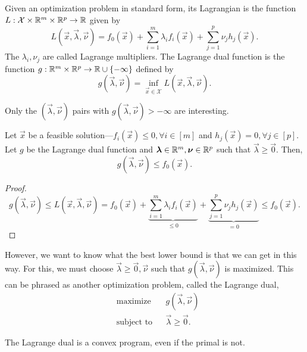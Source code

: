 \begin{definition}
    Given an optimization problem in standard form, its Lagrangian is the function $L: \mathcal{X} \times \mathbb{R}^m \times \mathbb{R}^p \to \mathbb{R}$ given by \[
        L(\vec{x},\vec{\lambda},\vec{\nu}) = f_0(\vec{x}) + \sum_{i=1}^{m} \lambda_i f_i(\vec{x}) + \sum_{j=1}^{p} \nu_j h_j(\vec{x}).
    \]
    The $\lambda_i,\nu_j$ are called Lagrange multipliers. The Lagrange dual function is the function
    $g: \mathbb{R}^m \times \mathbb{R}^p \to \mathbb{R} \cup \{ -\infty \}$ defined by \[
        g(\vec{\lambda},\vec{\nu}) = \inf_{\vec{x}\in \mathcal{X}} L(\vec{x},\vec{\lambda},\vec{\nu}).
    \]
\end{definition}

Only the $(\vec{\lambda},\vec{\nu})$ pairs with $g(\vec{\lambda},\vec{\nu}) > -\infty$ are
interesting.

\begin{lemma}
    Let $\vec{x}$ be a feasible solution---$f_i(\vec{x}) \leq 0, \forall i \in [m]$ and $h_j(\vec{x})
        = 0, \forall j \in [p]$. Let $g$ be the Lagrange dual function and $\bm{\lambda}\in \mathbb{R}^m,
        \bm{\nu}\in \mathbb{R}^p$ such that $\vec{\lambda} \geq \vec{0}$. Then, \[
        g(\vec{\lambda},\vec{\nu}) \leq f_0(\vec{x}).
    \]
\end{lemma}

\begin{proof}
    \[
        g(\vec{\lambda},\vec{\nu}) \leq L(\vec{x},\vec{\lambda},\vec{\nu}) = f_0(\vec{x}) + \underbrace{\sum_{i=1}^{m} \lambda_i f_i(\vec{x})}_{\leq 0} + \underbrace{\sum_{j=1}^{p} \nu_j h_j(\vec{x})}_{=0} \leq f_0(\vec{x}).
    \]
\end{proof}

However, we want to know what the best lower bound is that we can get in this way. For this, we
must choose $\vec{\lambda} \geq \vec{0}, \vec{\nu}$ such that $g(\vec{\lambda},\vec{\nu})$ is
maximized. This can be phrased as another optimization problem, called the Lagrange dual, \[
    \begin{aligned}
         & \text{maximize}   &  & g(\vec{\lambda},\vec{\nu})  \\
         & \text{subject to} &  & \vec{\lambda} \geq \vec{0}.
    \end{aligned}
\]

\begin{corollary}
    The Lagrange dual is a convex program, even if the primal is not.
\end{corollary}

